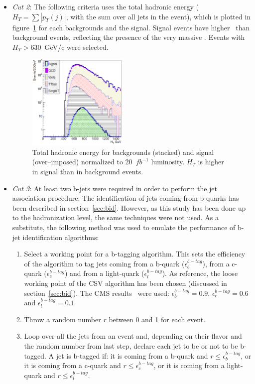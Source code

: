 \begin{itemize}
\item \textit{Cut 2}: The following criteria uses the total hadronic energy ($H_{T}=\sum |p_{T}(j)|$, with the sum over all jets in the event), which is plotted in figure~\ref{fig:Var2} for each backgrounds and the signal. Signal events have higher \HT~than background events, reflecting the presence of the very massive \Tp. Events with $H_{T}>630$~GeV/c were selected.

\begin{figure}[!Hhtbp]
  \begin{center}
    \includegraphics[width=0.45\textwidth]{figs/Pheno/HT.png}
    \caption{Total hadronic energy for backgrounds (stacked) and signal (over--imposed) normalized to 20~$fb^{-1}$ luminosity. $H_{T}$ is higher in signal than in background events.}
    \label{fig:Var2}
  \end{center}
\end{figure}

\item \textit{Cut 3}: At least two b-jets were required in order to perform the jet association procedure. The identification of jets coming from b-quarks has been described in section~\ref{sec:bid}. However, as this study has been done up to the hadronization level, the same techniques were not used. As a substitute, the following method was used to emulate the performance of b-jet identification algorithms:
  \begin{enumerate}
  \item Select a working point for a b-tagging algorithm. This sets the efficiency of the algorithm to tag jets coming from a b-quark ($\epsilon^{b-tag}_{b}$), from a c-quark ($\epsilon^{b-tag}_{c}$) and from a light-quark ($\epsilon^{b-tag}_{l}$). As reference, the loose working point of the CSV algorithm has been chosen (discussed in section~\ref{sec:bid}). The CMS results~\cite{CMS-PAS-BTV-13-001} were used: $\epsilon^{b-tag}_{b}=0.9$, $\epsilon^{b-tag}_{c}=0.6$ and $\epsilon^{b-tag}_{l}=0.1$. 
  \item Throw a random number $r$ between 0 and 1 for each event.
  \item Loop over all the jets from an event and, depending on their flavor and the random number from last step, declare each jet to be or not to be b-tagged. A jet is b-tagged if: it is coming from a b-quark and $r\leq\epsilon^{b-tag}_{b}$, or it is coming from a c-quark and $r\leq\epsilon^{b-tag}_{c}$, or it is coming from a light-quark and $r\leq\epsilon^{b-tag}_{l}$.
  \end{enumerate}


\end{itemize}
